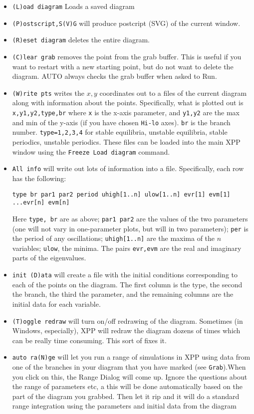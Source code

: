 \documentclass{article}
\begin{document}
\begin{itemize}
\begin{itemize}
\item {\tt (L)oad diagram} Loads a saved diagram
\item {\tt (P)ostscript,S(V)G} will produce postcript (SVG) of the current window.
\item {\tt (R)eset diagram} deletes the entire diagram.
\item {\tt (C)lear grab} removes the point from the grab buffer. This is useful if you want to restart with a new starting point, but do not want to delete the diagram. AUTO always checks the grab buffer when asked to Run.
\item {\tt (W)rite pts} writes the $x,y$ coordinates out to a files of the current diagram along with information about the points. Specifically, what is plotted out is {\tt x,y1,y2,type,br} where {\tt x} is the x-axis parameter, and {\tt y1,y2} are the max and min of the y-axis (if you have chosen {\tt Hi-lo} axes). {\tt br} is the branch number. {\tt type=1,2,3,4} for stable equilibria, unstable equilibria, stable periodics, unstable periodics.  These files can be loaded into the main XPP window using the {\tt Freeze Load diagram} command.
\item {\tt All info} will write out lots of information into a file. Specifically, each row has the following:
\begin{verbatim}
type br par1 par2 period uhigh[1..n] ulow[1..n] evr[1] evm[1] ...evr[n] evm[n]
\end{verbatim} 
Here {\tt type, br} are as above; {\tt par1 par2} are the values of the two parameters (one will not vary in one-parameter plots, but will in two parameters); {\tt per} is the period of any oscillations; {\tt uhigh[1..n]} are the maxima of the $n$ variables; {\tt ulow}, the minima. The pairs {\tt evr,evm} are the real and imaginary parts of the eigenvalues.
\item {\tt init (D)ata} will create a file with the initial conditions corresponding to each of the points on the diagram. The first column is the type, the second the branch, the third the parameter, and the remaining columns are the initial data for each variable.
\item {\tt (T)oggle redraw} will turn on/off redrawing of the diagram. Sometimes (in Windows, especially), XPP will redraw the diagram dozens of times which can be really time consuming. This sort of fixes it.
\item {\tt auto ra(N)ge} will let you run a range of simulations in XPP using data from one of the branches in your diagram that you have marked (see {\tt Grab}).When you click on this, the Range Dialog will come up. Ignore the questions about the range of parameters etc, a this will be done automatically based on the part of the diagram you grabbed. Then let it rip and it will do a standard range integration using the parameters and initial data from the diagram   

\end{itemize}
\end{itemize}
\end{document}
